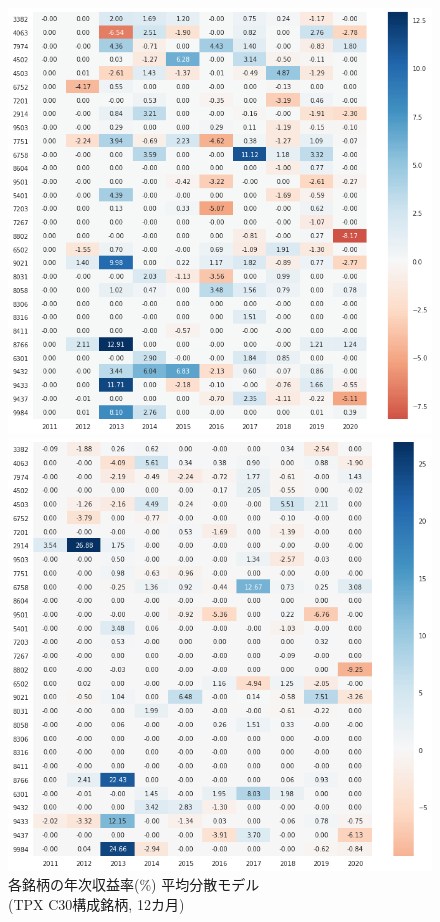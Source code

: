 \documentclass[dvipdfmx,autodetect-engine]{jsarticle}
\begin{document}
\newpage

\begin{figure}[htbp]
\begin{minipage}{0.5\hsize}
\begin{center}
\includegraphics[width=0.8\hsize]{./figures/mmvp_tpx30_w=12_hm.png}
\end{center}
\caption{\small 各銘柄の年次収益率(\%) 平均分散モデル\\(TPX C30構成銘柄, 12カ月)}
\label{fig:11}
\end{minipage}
\begin{minipage}{0.5\hsize}
\begin{center}
\includegraphics[width=0.8\hsize]{./figures/srmp_tpx30_w=12_hm.png}

\end{center}
\end{minipage}
\end{figure}
\end{document}
